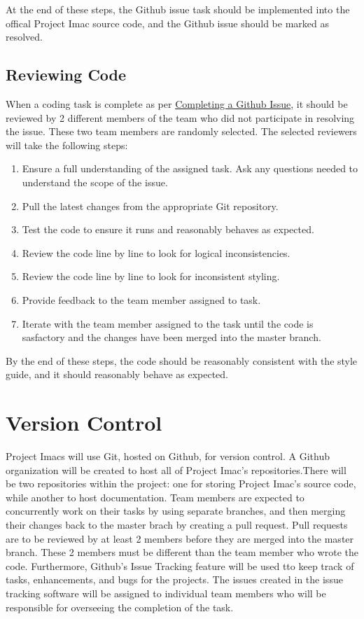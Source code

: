 \documentclass{article}
\begin{document}
At the end of these steps, the Github issue task should be implemented into the offical Project Imac source code, and the Github issue should be marked as resolved.

\subsection{Reviewing Code}
\label{sec:reviewing-code}
When a coding task is complete as per \hyperref[sec:gitthub-issue]{Completing a Github Issue}, it should be reviewed by 2 different members of the team who did not participate in resolving the issue. These two team members are randomly selected. The selected reviewers will take the following steps:

\begin{enumerate}
\item Ensure a full understanding of the assigned task. Ask any questions needed to understand the scope of the issue.
\item Pull the latest changes from the appropriate Git repository.
\item Test the code to ensure it runs and reasonably behaves as expected.
\item Review the code line by line to look for logical inconsistencies.
\item Review the code line by line to look for inconsistent styling.
\item Provide feedback to the team member assigned to task.
\item Iterate with the team member assigned to the task until the code is sasfactory and the changes have been merged into the master branch.
\end{enumerate}

By the end of these steps, the code should be reasonably consistent with the style guide, and it should reasonably behave as expected.

\section{Version Control}
\label{sec:version-control}
Project Imacs will use Git, hosted on Github, for version control. A Github organization will be created to host all of Project Imac's repositories.There will be two repositories within the project: one for storing Project Imac's source code, while another to host documentation. Team members are expected to concurrently work on their tasks by using separate branches, and then merging their changes back to the master brach by creating a pull request. Pull requests are to be reviewed by at least 2 members before they are merged into the master branch. These 2 members must be different than the team member who wrote the code. Furthermore, Github's Issue Tracking feature will be used tto keep track of tasks, enhancements, and bugs for the projects. The issues created in the issue tracking software will be assigned to individual team members who will be responsible for overseeing the completion of the task.
\end{document}
